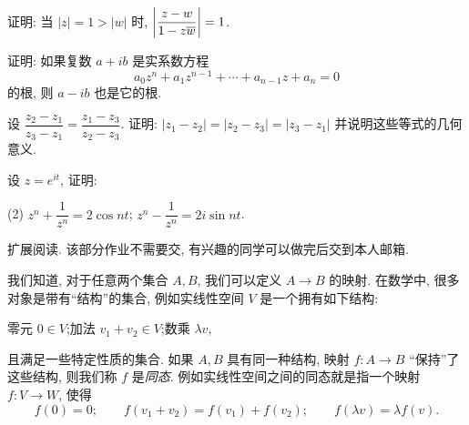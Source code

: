 \begin{homework}
    \begin{exlist}
      \item 证明: 当 $|z|=1>|w|$ 时, $\left|\dfrac{z-w}{1-z\overline w}\right|=1$.
      \item 证明: 如果复数 $a+ib$ 是实系数方程
      	\[a_0z^n+a_1z^{n-1}+\cdots+a_{n-1}z+a_n=0\]
      	的根, 则 $a-ib$ 也是它的根.
      \item 设 $\dfrac{z_2-z_1}{z_3-z_1}=\dfrac{z_1-z_3}{z_2-z_3}$. 证明: $|z_1-z_2|=|z_2-z_3|=|z_3-z_1|$ 并说明这些等式的几何意义.
      \item 设 $z=e^{it}$, 证明:\begin{tasks}(2)
          \task $z^n+\dfrac1{z^n}=2\cos{nt}$;
          \task $z^n-\dfrac1{z^n}=2i\sin{nt}$.
        \end{tasks}
    \end{exlist}
  \item 扩展阅读. 该部分作业不需要交, 有兴趣的同学可以做完后交到本人邮箱.
    \begin{exlist}
    \item 我们知道, 对于任意两个集合 $A,B$, 我们可以定义 $A\to B$ 的映射.
      在数学中, 很多对象是带有``结构''的集合, 例如实线性空间 $V$ 是一个拥有如下结构:
      \begin{center}
        零元 $0\in V$;\qquad 加法 $v_1+v_2\in V$;\qquad 数乘 $\lambda v$,
      \end{center}
      且满足一些特定性质的集合.
      如果 $A,B$ 具有同一种结构, 映射 $f:A\to B$ ``保持''了这些结构, 则我们称 $f$ 是\emph{同态}.	
      例如实线性空间之间的同态就是指一个映射 $f:V\to W$, 使得
      \[f(0)=0;\qquad f(v_1+v_2)=f(v_1)+f(v_2);\qquad f(\lambda v)=\lambda f(v).\]
    

\end{exlist}
\end{homework}

